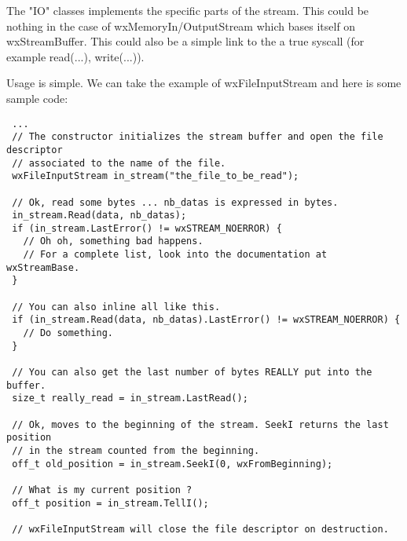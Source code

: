 The "IO" classes implements the specific parts of the stream. This could be
nothing in the case of wxMemoryIn/OutputStream which bases itself on
wxStreamBuffer. This could also be a simple link to the a true syscall
(for example read(...), write(...)).


Usage is simple. We can take the example of wxFileInputStream and here is some sample
code:

\begin{verbatim}
 ...
 // The constructor initializes the stream buffer and open the file descriptor
 // associated to the name of the file.
 wxFileInputStream in_stream("the_file_to_be_read");

 // Ok, read some bytes ... nb_datas is expressed in bytes.
 in_stream.Read(data, nb_datas);
 if (in_stream.LastError() != wxSTREAM_NOERROR) {
   // Oh oh, something bad happens.
   // For a complete list, look into the documentation at wxStreamBase.
 }

 // You can also inline all like this.
 if (in_stream.Read(data, nb_datas).LastError() != wxSTREAM_NOERROR) {
   // Do something.
 }

 // You can also get the last number of bytes REALLY put into the buffer.
 size_t really_read = in_stream.LastRead();

 // Ok, moves to the beginning of the stream. SeekI returns the last position 
 // in the stream counted from the beginning.
 off_t old_position = in_stream.SeekI(0, wxFromBeginning);
 
 // What is my current position ?
 off_t position = in_stream.TellI();

 // wxFileInputStream will close the file descriptor on destruction.
\end{verbatim}

